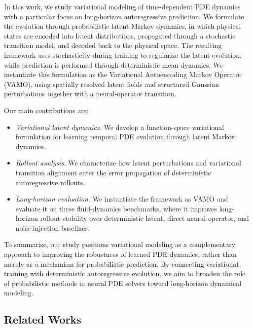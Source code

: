 \documentclass[11pt]{article}
\begin{document}
In this work, we study variational modeling of time-dependent PDE dynamics with a particular focus on long-horizon autoregressive prediction. We formulate the evolution through probabilistic latent Markov dynamics, in which physical states are encoded into latent distributions, propagated through a stochastic transition model, and decoded back to the physical space. The resulting framework uses stochasticity during training to regularize the latent evolution, while prediction is performed through deterministic mean dynamics. We instantiate this formulation as the Variational Autoencoding Markov Operator (VAMO), using spatially resolved latent fields and structured Gaussian perturbations together with a neural-operator transition.

Our main contributions are:

\begin{itemize}[topsep=0pt,itemsep=0pt]
\item\textit{Variational latent dynamics.} We develop a function-space variational formulation for learning temporal PDE evolution through latent Markov dynamics.
\item\textit{Rollout analysis.} We characterize how latent perturbations and variational transition alignment enter the error propagation of deterministic autoregressive rollouts.
\item\textit{Long-horizon evaluation.} We instantiate the framework as VAMO and evaluate it on three fluid-dynamics benchmarks, where it improves long-horizon rollout stability over deterministic latent, direct neural-operator, and noise-injection baselines.
\end{itemize}

To summarize, our study positions variational modeling as a complementary approach to improving the robustness of learned PDE dynamics, rather than merely as a mechanism for probabilistic prediction. By connecting variational training with deterministic autoregressive evolution, we aim to broaden the role of probabilistic methods in neural PDE solvers toward long-horizon dynamical modeling.

\subsection{Related Works}
\end{document}
